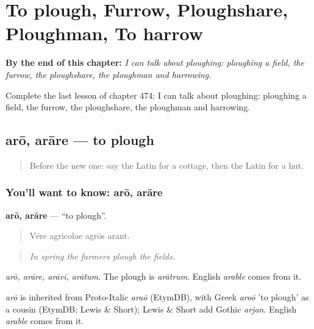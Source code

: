 
\chapter{To plough, Furrow, Ploughshare, Ploughman, To harrow}
\label{ch:la-to-plough-furrow-ploughshare-ploughman-to-harrow}

\begin{chapteropening}
\textbf{By the end of this chapter:} \emph{I can talk about ploughing: ploughing a field, the furrow, the ploughshare, the ploughman and harrowing.}

Complete the last lesson of chapter 474: I can talk about ploughing: ploughing a field, the furrow, the ploughshare, the ploughman and harrowing.
\end{chapteropening}

\section[arō, arāre]{arō, arāre — to plough}

\label{lesson:LA-C474-aro}



\begin{quote}
Before the new one: say the Latin for a cottage, then the Latin for a hut.
\end{quote}

\subsection*{You'll want to know: arō, arāre}
\textbf{arō, arāre} — \textquotedblleft{}to plough\textquotedblright{}.

\begin{quote}
Vēre agricolae agrōs arant.
\end{quote}

\begin{quote}
\emph{In spring the farmers plough the fields.}
\end{quote}

\emph{arō, arāre, arāvī, arātum}. The plough is \emph{arātrum}. English \emph{arable} comes from it.

\begin{cousinweb}
\emph{arō} is inherited from Proto-Italic \emph{araō} (EtymDB), with Greek \emph{aroō} 'to plough' as a cousin (EtymDB; Lewis \& Short); Lewis \& Short add Gothic \emph{arjan}. English \emph{arable} comes from it.
\end{cousinweb}

